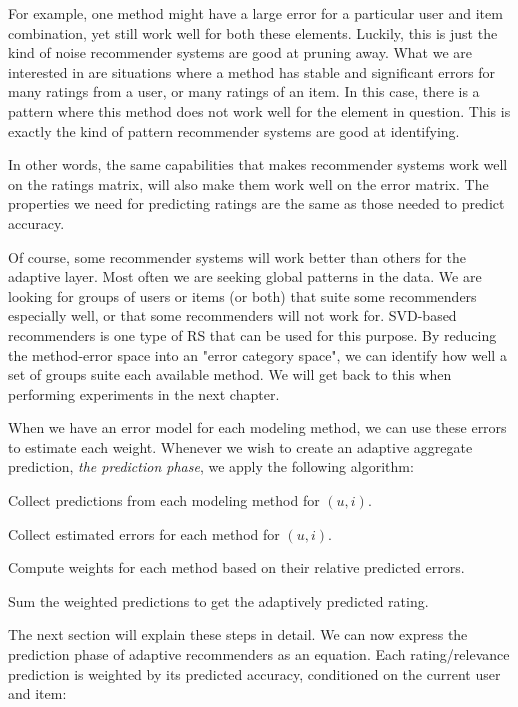 For example, one method might have a large error for a particular user and item combination,
yet still work well for both these elements. 
Luckily, this is 
just the kind of noise recommender systems are good at pruning away.
What we are interested in are situations where a method
has stable and significant errors for many ratings from a user,
or many ratings of an item.
In this case, there is a pattern where this method does not 
work well for the element in question.
This is exactly the kind of pattern recommender systems are good at identifying.

In other words, the same capabilities that makes recommender systems work well
on the ratings matrix, will also make them work well on the error matrix.
The properties we need for predicting ratings
are the same as those needed to predict accuracy.

Of course, some recommender systems will work better than others for the adaptive layer.
Most often we are seeking global patterns in the data.
We are looking for groups of users or items (or both) that suite some 
recommenders especially well, or that some recommenders will not work for.
SVD-based recommenders is one type of RS that can be used for this purpose.
By reducing the method-error space into an "error category space",
we can identify how well a set of groups suite each available method.
We will get back to this when performing experiments in the next chapter.

When we have an error model for each modeling method, 
we can use these errors to estimate each weight.
Whenever we wish to create an adaptive aggregate prediction,
\emph{the prediction phase},
we apply the following algorithm:

\begin{enumerate*}
  \item Collect predictions from each modeling method for $(u,i)$.
  \item Collect estimated errors for each method for $(u,i)$.
  \item Compute weights for each method based on their relative predicted errors.
  \item Sum the weighted predictions to get the adaptively predicted rating.
\end{enumerate*}

The next section will explain these steps in detail.
We can now express the prediction phase of adaptive recommenders as an equation.
Each rating/relevance prediction is weighted by its predicted accuracy,
conditioned on the current user and item:

